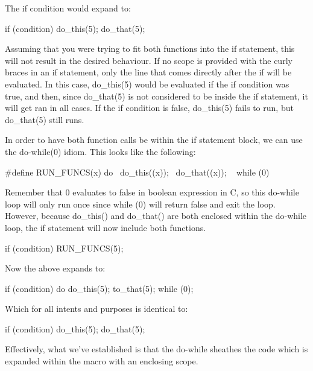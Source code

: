 \documentclass{article}
\begin{document}
The if condition would expand to:

\begin{clst}
if (condition)
	do_this(5);
	do_that(5);
\end{clst}

Assuming that you were trying to fit both functions into the if statement, this will not result in the desired
behaviour. If no scope is provided with the curly braces in an if statement, only the line that comes directly
after the if will be evaluated. In this case, do\_this(5) would be evaluated if the if condition was true, and
then, since do\_that(5) is not considered to be inside the if statement, it will get ran in all cases. If the
if condition is false, do\_this(5) fails to run, but do\_that(5) still runs.

In order to have both function calls be within the if statement block, we can use the do-while(0) idiom. This
looks like the following:

\begin{clst}
#define RUN_FUNCS(x) do { \
			     do_this((x)); \
			     do_that((x)); \
			     } while (0)
\end{clst}

Remember that 0 evaluates to false in boolean expression in C, so this do-while loop will only run once since
while (0) will return false and exit the loop. However, because do\_this() and do\_that() are both enclosed
within the do-while loop, the if statement will now include both functions.

\begin{clst}
if (condition)
	RUN_FUNCS(5);
\end{clst}

Now the above expands to:

\begin{clst}
if (condition)
	do {
		do_this(5);
		to_that(5);
	} while (0);
\end{clst}

Which for all intents and purposes is identical to:

\begin{clst}
if (condition) {
	do_this(5);
	do_that(5);
}
\end{clst}

Effectively, what we've established is that the do-while sheathes the code which is expanded within the macro
with an enclosing scope.
\end{document}
